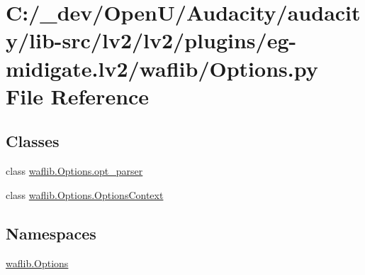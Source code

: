 \hypertarget{lv2_2plugins_2eg-midigate_8lv2_2waflib_2_options_8py}{}\section{C\+:/\+\_\+dev/\+Open\+U/\+Audacity/audacity/lib-\/src/lv2/lv2/plugins/eg-\/midigate.lv2/waflib/\+Options.py File Reference}
\label{lv2_2plugins_2eg-midigate_8lv2_2waflib_2_options_8py}
\subsection*{Classes}
\begin{DoxyCompactItemize}
\item 
class \hyperlink{classwaflib_1_1_options_1_1opt__parser}{waflib.\+Options.\+opt\+\_\+parser}
\item 
class \hyperlink{classwaflib_1_1_options_1_1_options_context}{waflib.\+Options.\+Options\+Context}
\end{DoxyCompactItemize}
\subsection*{Namespaces}
\begin{DoxyCompactItemize}
\item 
 \hyperlink{namespacewaflib_1_1_options}{waflib.\+Options}
\end{DoxyCompactItemize}
